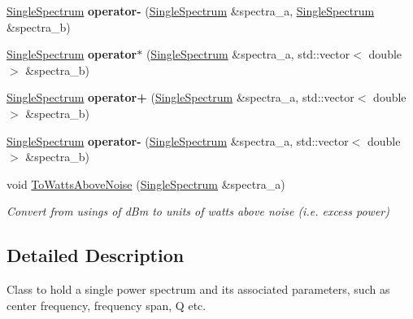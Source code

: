 \begin{DoxyCompactItemize}
\item 
\hyperlink{class_single_spectrum}{Single\+Spectrum} {\bfseries operator-\/} (\hyperlink{class_single_spectrum}{Single\+Spectrum} \&spectra\+\_\+a, \hyperlink{class_single_spectrum}{Single\+Spectrum} \&spectra\+\_\+b)\hypertarget{class_single_spectrum_a323a1a48dc567b58ac1a4ef41ddd06c7}{}\label{class_single_spectrum_a323a1a48dc567b58ac1a4ef41ddd06c7}

\item 
\hyperlink{class_single_spectrum}{Single\+Spectrum} {\bfseries operator$\ast$} (\hyperlink{class_single_spectrum}{Single\+Spectrum} \&spectra\+\_\+a, std\+::vector$<$ double $>$ \&spectra\+\_\+b)\hypertarget{class_single_spectrum_a03a486faf7f42ef4c5e407cf510a8ac8}{}\label{class_single_spectrum_a03a486faf7f42ef4c5e407cf510a8ac8}

\item 
\hyperlink{class_single_spectrum}{Single\+Spectrum} {\bfseries operator+} (\hyperlink{class_single_spectrum}{Single\+Spectrum} \&spectra\+\_\+a, std\+::vector$<$ double $>$ \&spectra\+\_\+b)\hypertarget{class_single_spectrum_a94b2bcfa34d2a268cf575ed0310f9862}{}\label{class_single_spectrum_a94b2bcfa34d2a268cf575ed0310f9862}

\item 
\hyperlink{class_single_spectrum}{Single\+Spectrum} {\bfseries operator-\/} (\hyperlink{class_single_spectrum}{Single\+Spectrum} \&spectra\+\_\+a, std\+::vector$<$ double $>$ \&spectra\+\_\+b)\hypertarget{class_single_spectrum_af09eb1e4819bdc296e86ae5184801c15}{}\label{class_single_spectrum_af09eb1e4819bdc296e86ae5184801c15}

\item 
void \hyperlink{class_single_spectrum_a50289b4319d5367695533d6a92833109}{To\+Watts\+Above\+Noise} (\hyperlink{class_single_spectrum}{Single\+Spectrum} \&spectra\+\_\+a)\hypertarget{class_single_spectrum_a50289b4319d5367695533d6a92833109}{}\label{class_single_spectrum_a50289b4319d5367695533d6a92833109}

\begin{DoxyCompactList}\small\item\em Convert from usings of d\+Bm to units of watts above noise (i.\+e. excess power) \end{DoxyCompactList}\end{DoxyCompactItemize}


\subsection{Detailed Description}
Class to hold a single power spectrum and its associated parameters, such as center frequency, frequency span, Q etc. 

